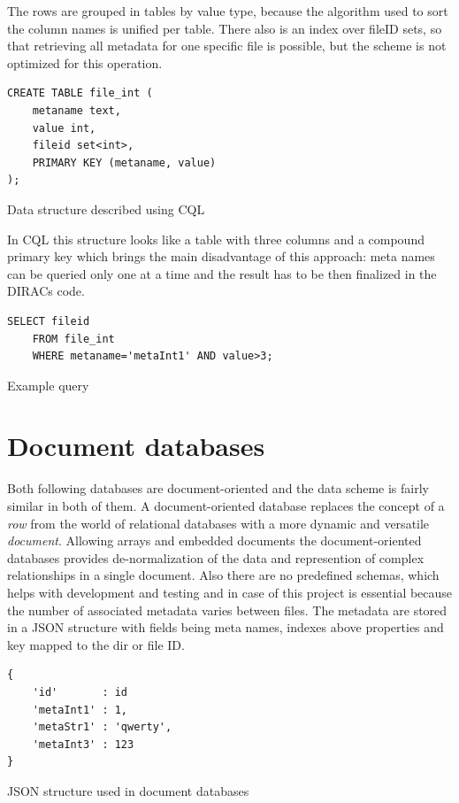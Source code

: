 The rows are grouped
in tables by value type, because the algorithm used to sort the
column names is unified per table. There also is an index over fileID sets, 
so that retrieving all metadata for one specific file is possible, but the scheme is 
not optimized for this operation.

\begin{listing}
\begin{verbatim}
CREATE TABLE file_int (
    metaname text,
    value int,
    fileid set<int>,
    PRIMARY KEY (metaname, value)
);
\end{verbatim}
\caption{Data structure described using CQL}
\end{listing}

In CQL this structure looks like a table with three columns and a compound primary key which
brings the main disadvantage of this approach: meta names can be queried only one at a time and
the result has to be then finalized in the DIRACs code.

\begin{listing}
\begin{verbatim}
SELECT fileid 
	FROM file_int 
	WHERE metaname='metaInt1' AND value>3;
\end{verbatim}
\caption{Example query}
\end{listing}

\section{Document databases}

Both following databases are document-oriented and the data scheme is fairly similar in both
of them. A document-oriented database replaces the concept of a \textit{row} from the world of relational 
databases with a more dynamic and versatile \textit{document}. Allowing arrays and embedded documents the 
document-oriented databases provides de-normalization of the data and represention of complex 
relationships in a single document. Also there are no predefined schemas, which helps with development 
and testing and in case of this project is essential because the number of associated metadata varies between 
files. The metadata are stored in a JSON structure with fields being meta names, indexes above properties and key 
mapped to the dir or file ID.

\begin{listing}
\begin{verbatim}
{
	'id'       : id
	'metaInt1' : 1,
	'metaStr1' : 'qwerty',
	'metaInt3' : 123
}
\end{verbatim}
\caption{JSON structure used in document databases}
\end{listing}


